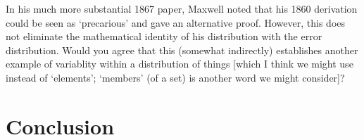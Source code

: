 \documentclass{article}
\begin{document}
In his much more substantial 1867 paper, Maxwell noted that his 1860 derivation could be seen as `precarious' and gave an alternative proof. However, this does not eliminate the mathematical identity of his distribution with the error distribution. Would you agree that this (somewhat indirectly) establishes another example of variablity within a distribution of things [which I think we might use instead of `elements'; `members' (of a set) is another word we might consider]?


\section{Conclusion}

  

\end{document}
